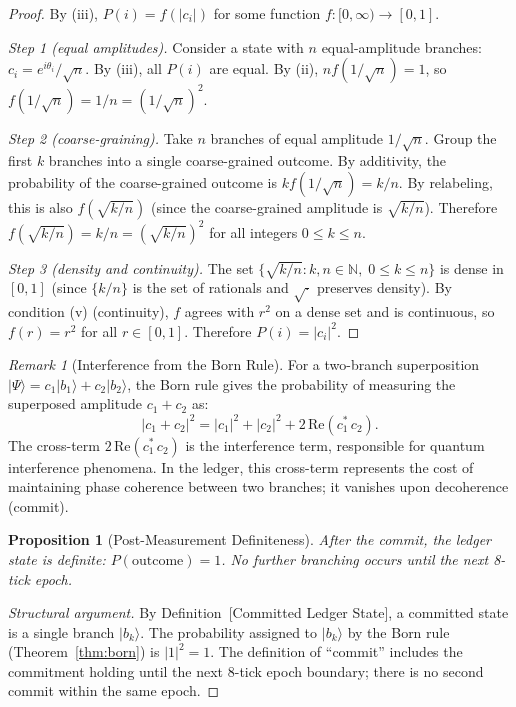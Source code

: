 \documentclass[12pt,a4paper]{article}
\newtheorem{proposition}[theorem]{Proposition}
\theoremstyle{definition}
\theoremstyle{remark}
\newtheorem{remark}[theorem]{Remark}
\begin{document}
\begin{proof}
By (iii), $P(i) = f(|c_i|)$ for some function
$f:[0,\infty) \to [0,1]$.

\textit{Step 1 (equal amplitudes).}
Consider a state with $n$ equal-amplitude branches:
$c_i = e^{i\theta_i}/\sqrt{n}$.  By (iii), all $P(i)$ are equal.
By (ii), $nf(1/\sqrt{n}) = 1$, so
$f(1/\sqrt{n}) = 1/n = (1/\sqrt{n})^2$.

\textit{Step 2 (coarse-graining).}
Take $n$ branches of equal amplitude $1/\sqrt{n}$.  Group the
first $k$ branches into a single coarse-grained outcome.  By
additivity, the probability of the coarse-grained outcome is
$kf(1/\sqrt{n}) = k/n$.  By relabeling, this is also
$f(\sqrt{k/n})$ (since the coarse-grained amplitude is
$\sqrt{k/n}$).  Therefore
$f(\sqrt{k/n}) = k/n = (\sqrt{k/n})^2$ for all
integers $0 \leq k \leq n$.

\textit{Step 3 (density and continuity).}
The set $\{\sqrt{k/n} : k, n \in \mathbb{N},\; 0 \leq k \leq n\}$
is dense in $[0,1]$ (since $\{k/n\}$ is the set of rationals and
$\sqrt{\cdot}$ preserves density).  By condition (v) (continuity),
$f$ agrees with $r^2$ on a dense set and is continuous, so
$f(r) = r^2$ for all $r \in [0,1]$.  Therefore
$P(i) = |c_i|^2$.
\end{proof}

\begin{remark}[Interference from the Born Rule]
For a two-branch superposition $|\Psi\rangle = c_1|b_1\rangle +
c_2|b_2\rangle$, the Born rule gives the probability of measuring
the superposed amplitude $c_1 + c_2$ as:
\begin{equation}
  |c_1 + c_2|^2 = |c_1|^2 + |c_2|^2
  + 2\,\mathrm{Re}(c_1^*\,c_2).
\end{equation}
The cross-term $2\,\mathrm{Re}(c_1^*\,c_2)$ is the interference
term, responsible for quantum interference phenomena.  In the ledger,
this cross-term represents the cost of maintaining phase coherence
between two branches; it vanishes upon decoherence (commit).
\end{remark}

\begin{proposition}[Post-Measurement Definiteness]
\label{thm:definite}
After the commit, the ledger state is definite:
$P(\text{outcome}) = 1$.  No further branching occurs until the
next 8-tick epoch.
\end{proposition}

\begin{proof}[Structural argument]
By Definition~[Committed Ledger State], a committed state is a
single branch $|b_k\rangle$.  The probability assigned to $|b_k\rangle$
by the Born rule (Theorem~\ref{thm:born}) is $|1|^2 = 1$.
The definition of ``commit'' includes the commitment holding until
the next 8-tick epoch boundary; there is no second commit within the
same epoch.
\end{proof}
\end{document}

